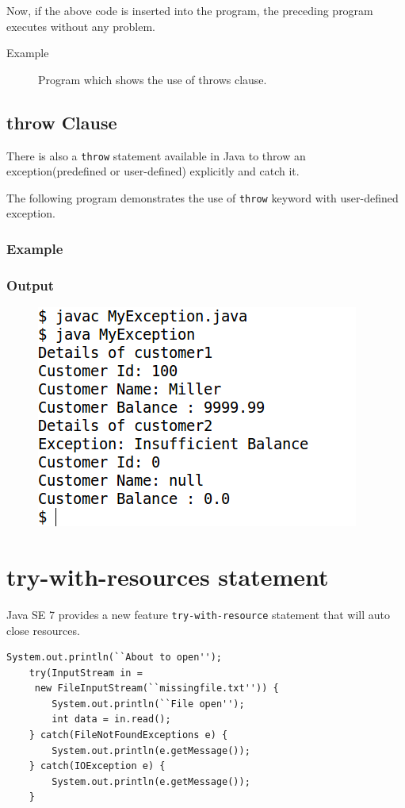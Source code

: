 \documentclass[11pt,a4paper]{article}
\begin{document}
Now, if the above code is inserted into the program, the preceding program executes without any problem.
\begin{description}
\item[Example] Program which shows the use of throws clause.


\end{description}
\subsection*{throw Clause}
There is also a \texttt{throw} statement available in Java to throw an exception(predefined or user-defined) explicitly and catch it. 

The following program demonstrates the use of \lstinline!throw! keyword with user-defined exception.

\subsubsection*{Example}

\subsubsection*{Output}
\begin{figure}[H]
\begin{center}
\includegraphics[scale=.5]{throw-example.png}
\end{center}
\end{figure}
\section*{try-with-resources statement}
Java SE 7 provides a new feature \texttt{try-with-resource} statement that will auto close resources.
\begin{lstlisting}[numbers=none]
    System.out.println(``About to open'');
    try(InputStream in = 
     new FileInputStream(``missingfile.txt'')) {
        System.out.println(``File open'');
        int data = in.read();
    } catch(FileNotFoundExceptions e) {
        System.out.println(e.getMessage());
    } catch(IOException e) {
        System.out.println(e.getMessage());
    }
\end{lstlisting}
\end{document}
